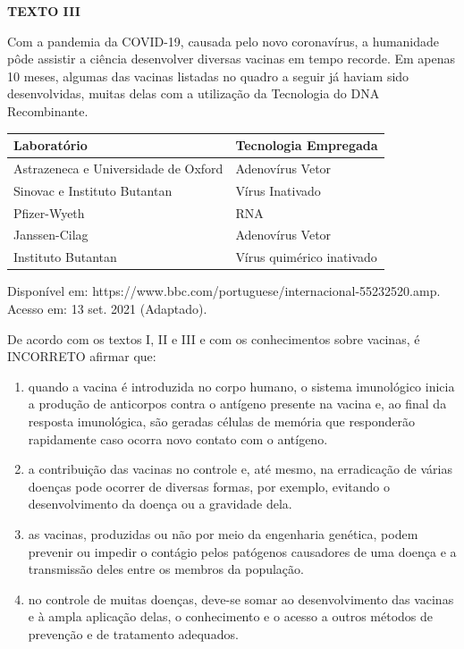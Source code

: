 \par



\par

\textbf{TEXTO III}

\par

Com a pandemia da COVID-19, causada pelo novo coronavírus, a humanidade pôde assistir a ciência desenvolver diversas vacinas em tempo recorde. Em apenas 10 meses, algumas das vacinas listadas no quadro a seguir já haviam sido desenvolvidas, muitas delas com a utilização da Tecnologia do DNA Recombinante.

\par

\begin{center}
\begin{tabular}{l|l}
\textbf{Laboratório} & \textbf{Tecnologia Empregada} \\ \hline
Astrazeneca e Universidade de Oxford & Adenovírus Vetor \\ \hline
Sinovac e Instituto Butantan & Vírus Inativado \\ \hline
Pfizer-Wyeth & RNA \\ \hline
Janssen-Cilag & Adenovírus Vetor \\ \hline
Instituto Butantan & Vírus quimérico inativado
\end{tabular}
\end{center}

Disponível em: https://www.bbc.com/portuguese/internacional-55232520.amp. Acesso em: 13 set. 2021 (Adaptado).

\par

De acordo com os textos I, II e III e com os conhecimentos sobre vacinas, é INCORRETO afirmar que:


\begin{enumerate}
\item quando a vacina é introduzida no corpo humano, o sistema imunológico inicia a produção de anticorpos
        contra o antígeno presente na vacina e, ao final da resposta imunológica, são geradas células de memória
        que responderão rapidamente caso ocorra novo contato com o antígeno.
\item a contribuição das vacinas no controle e, até mesmo, na erradicação de várias doenças pode ocorrer de
        diversas formas, por exemplo, evitando o desenvolvimento da doença ou a gravidade dela.
\item as vacinas, produzidas ou não por meio da engenharia genética, podem prevenir ou impedir o contágio
        pelos patógenos causadores de uma doença e a transmissão deles entre os membros da população.
\item no controle de muitas doenças, deve-se somar ao desenvolvimento das vacinas e à ampla aplicação
        delas, o conhecimento e o acesso a outros métodos de prevenção e de tratamento adequados.\end{enumerate}

